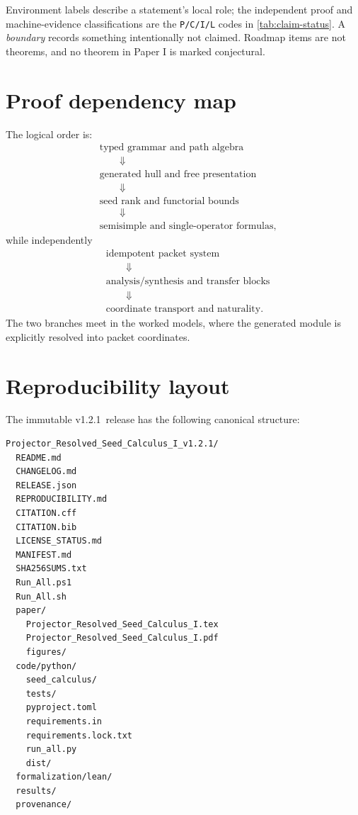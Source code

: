 \documentclass[11pt]{article}
\theoremstyle{definition}
\theoremstyle{remark}
\newcommand{\paperversion}{1.2.1}
\begin{document}
Environment labels describe a statement's local role; the independent proof and machine-evidence classifications are the \texttt{P/C/I/L} codes in \cref{tab:claim-status}. A \emph{boundary} records something intentionally not claimed. Roadmap items are not theorems, and no theorem in Paper I is marked conjectural.

\section{Proof dependency map}

The logical order is:
\[
\begin{aligned}
&\text{typed grammar and path algebra}\\
&\qquad\Downarrow\\
&\text{generated hull and free presentation}\\
&\qquad\Downarrow\\
&\text{seed rank and functorial bounds}\\
&\qquad\Downarrow\\
&\text{semisimple and single-operator formulas},
\end{aligned}
\]
while independently
\[
\begin{aligned}
&\text{idempotent packet system}\\
&\qquad\Downarrow\\
&\text{analysis/synthesis and transfer blocks}\\
&\qquad\Downarrow\\
&\text{coordinate transport and naturality}.
\end{aligned}
\]
The two branches meet in the worked models, where the generated module is explicitly resolved into packet coordinates.

\section{Reproducibility layout}

The immutable v\paperversion\ release has the following canonical structure:
\begin{lstlisting}
Projector_Resolved_Seed_Calculus_I_v1.2.1/
  README.md
  CHANGELOG.md
  RELEASE.json
  REPRODUCIBILITY.md
  CITATION.cff
  CITATION.bib
  LICENSE_STATUS.md
  MANIFEST.md
  SHA256SUMS.txt
  Run_All.ps1
  Run_All.sh
  paper/
    Projector_Resolved_Seed_Calculus_I.tex
    Projector_Resolved_Seed_Calculus_I.pdf
    figures/
  code/python/
    seed_calculus/
    tests/
    pyproject.toml
    requirements.in
    requirements.lock.txt
    run_all.py
    dist/
  formalization/lean/
  results/
  provenance/
\end{lstlisting}
\end{document}
